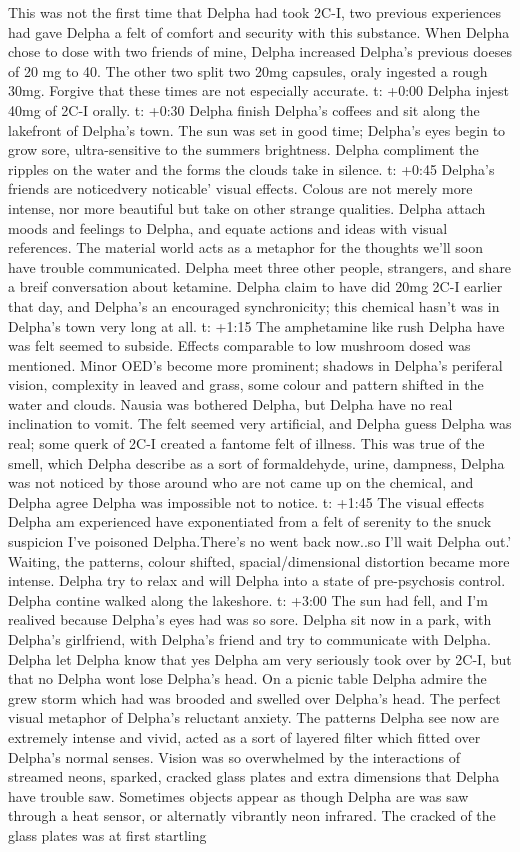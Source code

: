 \documentclass[12pt]{book}
\begin{document}
This was not the first time that Delpha had took 2C-I, two previous experiences had gave Delpha a felt of comfort and security with this substance. When Delpha chose to dose with two friends of mine, Delpha increased Delpha's previous doeses of 20 mg to 40. The other two split two 20mg capsules, oraly ingested a rough 30mg. Forgive that these times are not especially accurate. t: +0:00 Delpha injest 40mg of 2C-I orally. t: +0:30 Delpha finish Delpha's coffees and sit along the lakefront of Delpha's town. The sun was set in good time; Delpha's eyes begin to grow sore, ultra-sensitive to the summers brightness. Delpha compliment the ripples on the water and the forms the clouds take in silence. t: +0:45 Delpha's friends are noticedvery noticable' visual effects. Colous are not merely more intense, nor more beautiful but take on other strange qualities. Delpha attach moods and feelings to Delpha, and equate actions and ideas with visual references. The material world acts as a metaphor for the thoughts we'll soon have trouble communicated. Delpha meet three other people, strangers, and share a breif conversation about ketamine. Delpha claim to have did 20mg 2C-I earlier that day, and Delpha's an encouraged synchronicity; this chemical hasn't was in Delpha's town very long at all. t: +1:15 The amphetamine like rush Delpha have was felt seemed to subside. Effects comparable to low mushroom dosed was mentioned. Minor OED's become more prominent; shadows in Delpha's periferal vision, complexity in leaved and grass, some colour and pattern shifted in the water and clouds. Nausia was bothered Delpha, but Delpha have no real inclination to vomit. The felt seemed very artificial, and Delpha guess Delpha was real; some querk of 2C-I created a fantome felt of illness. This was true of the smell, which Delpha describe as a sort of formaldehyde, urine, dampness, Delpha was not noticed by those around who are not came up on the chemical, and Delpha agree Delpha was impossible not to notice. t: +1:45 The visual effects Delpha am experienced have exponentiated from a felt of serenity to the snuck suspicion I've poisoned Delpha.There's no went back now..so I'll wait Delpha out.' Waiting, the patterns, colour shifted, spacial/dimensional distortion became more intense. Delpha try to relax and will Delpha into a state of pre-psychosis control. Delpha contine walked along the lakeshore. t: +3:00 The sun had fell, and I'm realived because Delpha's eyes had was so sore. Delpha sit now in a park, with Delpha's girlfriend, with Delpha's friend and try to communicate with Delpha. Delpha let Delpha know that yes Delpha am very seriously took over by 2C-I, but that no Delpha wont lose Delpha's head. On a picnic table Delpha admire the grew storm which had was brooded and swelled over Delpha's head. The perfect visual metaphor of Delpha's reluctant anxiety. The patterns Delpha see now are extremely intense and vivid, acted as a sort of layered filter which fitted over Delpha's normal senses. Vision was so overwhelmed by the interactions of streamed neons, sparked, cracked glass plates and extra dimensions that Delpha have trouble saw. Sometimes objects appear as though Delpha are was saw through a heat sensor, or alternatly vibrantly neon infrared. The cracked of the glass plates was at first startling 
\end{document}

